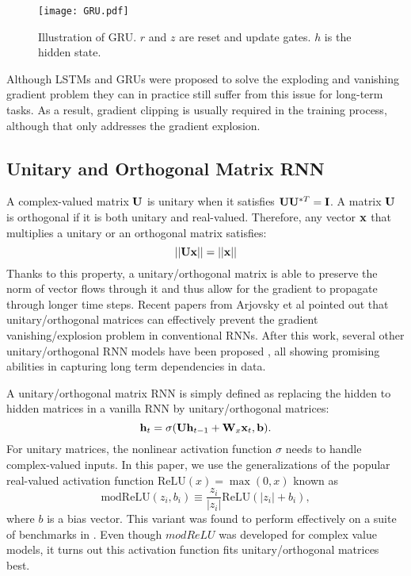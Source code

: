 \documentclass[letterpaper]{article} \usepackage{aaai18}  \usepackage{times}  \usepackage{helvet}  \usepackage{courier}  \usepackage{url}  \usepackage{graphicx}
\def\b{{\bf b}}
\def\h{{\bf h}}
\def\x{{\bf x}}
\def\I{{\bf I}}
\def\U{{\bf U}}
\def\W{{\bf W}}
\begin{document}
\begin{figure}[h!]
\centering
\texttt{[image: GRU.pdf]}
\caption{Illustration of GRU. $r$ and $z$ are reset and update gates. $h$ is the hidden state.}
\label{fig:gru}
\end{figure} 

Although LSTMs and GRUs were proposed to solve the exploding and vanishing gradient problem \cite{hochreiter1991untersuchungen,bengio1994learning} they can in practice still suffer from this issue for long-term tasks. As a result, gradient clipping \cite{pascanu2013difficulty} is usually required in the training process, although that only addresses the gradient explosion. 

\subsection{Unitary and Orthogonal Matrix RNN}
A complex-valued matrix $\U$ is unitary when it satisfies $\U\U^{*T} = \I$. A matrix $\U$ is orthogonal if it is both unitary and real-valued. Therefore, any vector $\x$ that multiplies a unitary or an orthogonal matrix satisfies:
\begin{equation}
||\U\x|| = ||\x|| 
\end{equation} 
Thanks to this property, a unitary/orthogonal matrix is able to preserve the norm of vector flows through it and thus allow for the gradient to propagate through longer time steps. Recent papers from Arjovsky et al \cite{arjovsky2015unitary,henaff2016orthogonal} pointed out that unitary/orthogonal matrices can effectively prevent the gradient vanishing/explosion problem in conventional RNNs. After this work, several other unitary/orthogonal RNN models have been proposed \cite{jing2016tunable,wisdom2016full,hyland2016learning,mhammedi2016efficient}, all showing promising abilities in capturing long term dependencies in data.

A unitary/orthogonal matrix RNN is simply defined as replacing the hidden to hidden matrices in a vanilla RNN by unitary/orthogonal matrices:
\begin{equation}
\h_t = \sigma(\U \h_{t-1} + \W_x \x_t, \b) .
\end{equation}
For unitary matrices, the nonlinear activation function $\sigma$ needs to handle complex-valued inputs.
In this paper, we use the generalizations of the popular real-valued activation function $\mathrm{ReLU}(x)=\max(0,x)$ known as
\begin{equation}
\mathrm{modReLU}(z_i, b_i)\equiv\frac{z_i}{|z_i|}\mathrm{ReLU}(|z_i| + b_i),
\end{equation}
where $b$ is a bias vector.
This variant was found to perform effectively on a suite of benchmarks in \cite{arjovsky2015unitary,jing2016tunable}. Even though $modReLU$ was developed for complex value models, it turns out this activation function fits unitary/orthogonal matrices best. 
\end{document}
